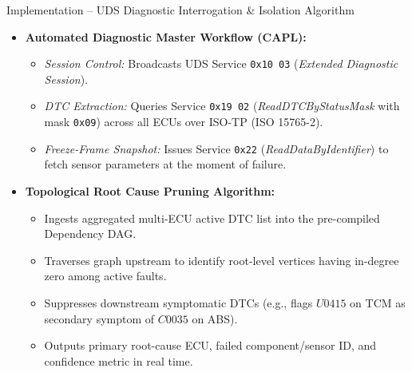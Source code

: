 \documentclass[aspectratio=169, 10pt]{beamer}
\begin{document}
\begin{frame}{Implementation -- UDS Diagnostic Interrogation \& Isolation Algorithm}
  \begin{itemize}
    \item \textbf{Automated Diagnostic Master Workflow (CAPL):}
    \begin{itemize}
      \item \textit{Session Control:} Broadcasts UDS Service \texttt{0x10 03} (\textit{Extended Diagnostic Session}).
      \item \textit{DTC Extraction:} Queries Service \texttt{0x19 02} (\textit{ReadDTCByStatusMask} with mask \texttt{0x09}) across all ECUs over ISO-TP (ISO 15765-2).
      \item \textit{Freeze-Frame Snapshot:} Issues Service \texttt{0x22} (\textit{ReadDataByIdentifier}) to fetch sensor parameters at the moment of failure.
    \end{itemize}
    \item \textbf{Topological Root Cause Pruning Algorithm:}
    \begin{itemize}
      \item Ingests aggregated multi-ECU active DTC list into the pre-compiled Dependency DAG.
      \item Traverses graph upstream to identify root-level vertices having in-degree zero among active faults.
      \item Suppresses downstream symptomatic DTCs (e.g., flags $U0415$ on TCM as secondary symptom of $C0035$ on ABS).
      \item Outputs primary root-cause ECU, failed component/sensor ID, and confidence metric in real time.
    \end{itemize}
  \end{itemize}
\end{frame}
\end{document}
